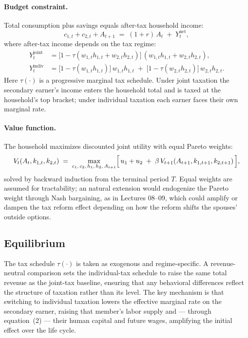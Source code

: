 \paragraph{Budget constraint.} Total consumption plus savings equals after-tax household income:
\vspace{-0.5em}
\begin{equation}
    c_{1,t} + c_{2,t} + A_{t+1} \;=\; (1+r)\,A_t \;+\; Y^{\text{net}}_t,
\end{equation}
\vspace{-0.5em}
where after-tax income depends on the tax regime:
\vspace{-0.5em}
\begin{align}
    Y^{\text{joint}}_t  &= \bigl[1 - \tau(w_{1,t}h_{1,t} + w_{2,t}h_{2,t})\bigr]\,(w_{1,t}h_{1,t} + w_{2,t}h_{2,t}), \\
    Y^{\text{indiv}}_t  &= \bigl[1-\tau(w_{1,t}h_{1,t})\bigr]\,w_{1,t}h_{1,t} \;+\; \bigl[1-\tau(w_{2,t}h_{2,t})\bigr]\,w_{2,t}h_{2,t}.
\end{align}
Here $\tau(\cdot)$ is a progressive marginal tax schedule.
Under joint taxation the secondary earner's income enters the household total and is taxed at the household's top bracket; under individual taxation each earner faces their own marginal rate.
\vspace{-0.5em}
\paragraph{Value function.} The household maximizes discounted joint utility with equal Pareto weights:
\begin{equation}
    V_t(A_t, k_{1,t}, k_{2,t}) \;=\; \max_{c_1,\, c_2,\, h_1,\, h_2,\, A_{t+1}}
    \Bigl[\, u_1 + u_2 \;+\; \beta\, V_{t+1}(A_{t+1}, k_{1,t+1}, k_{2,t+1}) \,\Bigr],
\end{equation}
solved by backward induction from the terminal period $T$. Equal weights are assumed for tractability; an natural extension would endogenize the Pareto weight through Nash bargaining, as in Lectures 08--09, which could amplify or dampen the tax reform effect depending on how the reform shifts the spouses' outside options.
\vspace{-0.5em}
\subsection{Equilibrium}

The tax schedule $\tau(\cdot)$ is taken as exogenous and regime-specific.
A revenue-neutral comparison sets the individual-tax schedule to raise the same total revenue as the joint-tax baseline, ensuring that any behavioral differences reflect the structure of taxation rather than its level.
The key mechanism is that switching to individual taxation lowers the effective marginal rate on the secondary earner, raising that member's labor supply and --- through equation~(2) --- their human capital and future wages, amplifying the initial effect over the life cycle.
